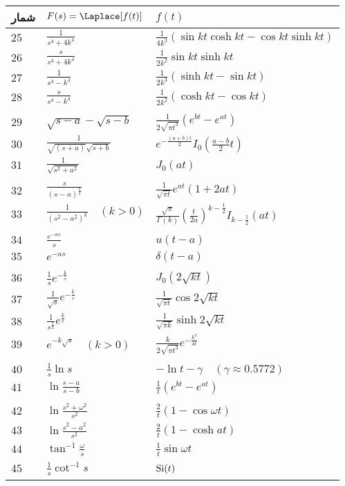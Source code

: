 \begin{table}
\centering
\begin{tabular}{lll}
شمار & $F(s)=\Laplace[f(t)]$ & $f(t)$ \Tstrut \\
\hline 
$25$ & $\frac{1}{s^4+4k^4}$ & $\frac{1}{4k^3}(\sin kt\cosh kt-\cos kt\sinh kt)$  \Tstrut\\
$26$ & $\frac{s}{s^4+4k^4}$ & $\frac{1}{2k^2}\sin kt \sinh kt$ \Tstrut\\
$27$ & $\frac{1}{s^4-k^4}$ & $\frac{1}{2k^3} (\sinh kt-\sin kt)$ \Tstrut\\
$28$ & $\frac{s}{s^4-k^4}$ & $\frac{1}{2k^2}(\cosh kt-\cos kt)$\Tstrut \\
\\
$29$ & $\sqrt{s-a}-\sqrt{s-b}$ & $\frac{1}{2\sqrt{\pi t^3}} (e^{bt}-e^{at})$  \Tstrut\\
$30$ & $\frac{1}{\sqrt{(s+a)}\sqrt{s+b}}$ & $e^{-\frac{(a+b)t}{2}} I_0 \left(\frac{a-b}{2}t\right)$  \Tstrut\\
$31$ & $\frac{1}{\sqrt{s^2+a^2}}$ & $J_0(at)$  \Tstrut\\
\\
$32$ & $\frac{s}{(s-a)^{\frac{3}{2}}}$ & $\frac{1}{\sqrt{\pi t}}e^{at}(1+2at)$  \Tstrut\\
$33$ & $\frac{1}{(s^2-a^2)^k} \quad (k>0)$ & $\frac{\sqrt{\pi}}{\Gamma(k)} \left(\frac{t}{2a}\right)^{k-\tfrac{1}{2}} I_{k-\tfrac{1}{2}}(at)$  \Tstrut\\
\\
$34$ & $\frac{e^{-as}}{s}$ & $u(t-a)$  \Tstrut\\
$35$ & $e^{-as}$ & $\delta(t-a)$  \Tstrut\\
\\
$36$ & $\frac{1}{s}e^{-\tfrac{k}{s}}$ & $J_0(2\sqrt{kt})$  \Tstrut\\
$37$ & $\frac{1}{\sqrt{s}}e^{-\tfrac{k}{s}}$ & $\frac{1}{\sqrt{\pi t}}\cos 2\sqrt{kt}$  \Tstrut\\
$38$ & $\frac{1}{s^{\tfrac{3}{2}}}e^{\tfrac{k}{s}}$ & $\frac{1}{\sqrt{\pi k}}\sinh 2\sqrt{kt}$  \Tstrut\\
$39$ & $e^{-k\sqrt{s}} \quad (k>0)$ & $\frac{k}{2\sqrt{\pi t^3}}e^{-\tfrac{k^2}{4t}}$  \Tstrut\\
\\
$40$ & $\frac{1}{s}\ln s$ & $-\ln t-\gamma \quad (\gamma \approx 0.5772)$  \Tstrut\\
$41$ & $\ln \frac{s-a}{s-b}$ & $\frac{1}{t}(e^{bt}-e^{at})$  \Tstrut\\
\\
$42$ & $\ln \frac{s^2+\omega^2}{s^2}$ & $\frac{2}{t}(1-\cos \omega t)$  \Tstrut\\
$43$ & $\ln \frac{s^2-a^2}{s^2}$ & $\frac{2}{t}(1-\cosh at)$  \Tstrut\\
$44$ & $\tan^{-1} \frac{\omega}{s}$ & $\frac{1}{t}\sin \omega t$  \Tstrut\\
$45$ & $\frac{1}{s}\cot^{-1} s $ & $\textup{Si} (t)  \Tstrut \Bstrut$
\end{tabular}
\end{table}

